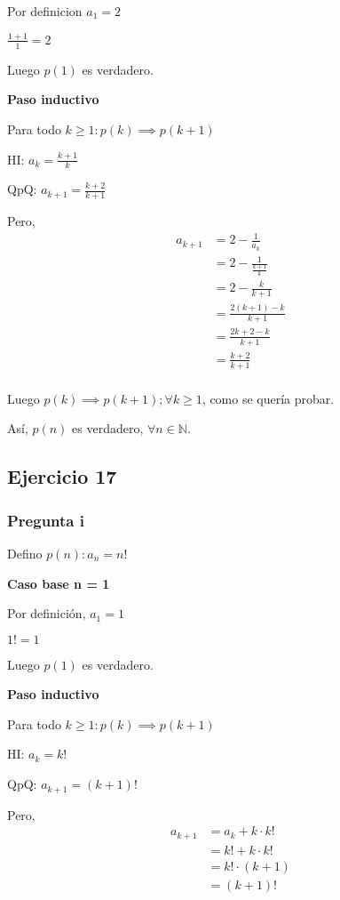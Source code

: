 Por definicion $ a_1 = 2$

$ \frac{1+1}{1} = 2 $

Luego $ p(1) $ es verdadero.

\textbf{Paso inductivo}

Para todo $k \geq 1: p(k) \implies p(k+1)$

HI: $ a_k = \frac{k+1}{k}$

QpQ: $ a_{k+1} = \frac{k+2}{k+1}$

Pero,
\begin{align*}
    a_{k+1} &= 2-\frac{1}{a_k} \\ 
    &= 2-\frac{1}{\frac{k+1}{k}} \\ 
    &= 2-\frac{k}{k+1} \\
    &= \frac{2(k+1)-k}{k+1} \\
    &= \frac{2k+2-k}{k+1} \\
    &= \frac{k+2}{k+1} \\
\end{align*}

Luego $p(k) \implies p(k+1); \forall k \geq 1$, como se quería probar.

Así, $p(n)$ es verdadero, $\forall n \in \mathbb{N}$.

\subsection{Ejercicio 17}

\subsubsection{Pregunta i}

Defino $ p(n): a_n = n! $

\textbf{Caso base n = 1}

Por definición, $a_1 = 1$

$ 1! = 1 $

Luego $ p(1) $ es verdadero.

\textbf{Paso inductivo}

Para todo $k \geq 1: p(k) \implies p(k+1)$

HI: $ a_k = k!$

QpQ: $ a_{k+1} = (k+1)!$

Pero,
\begin{align*}
    a_{k+1} &= a_k + k\cdot k! \\
    &= k! + k\cdot k! \\
    &= k! \cdot (k+1) \\
    &= (k+1)! \\
\end{align*}

